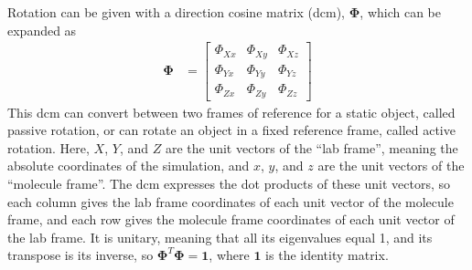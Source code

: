 \documentclass[11pt]{article}
\begin{document}
Rotation can be given with a direction cosine matrix (dcm), $\bm{\Phi}$, which can be expanded as
\begin{align}
\bm{\Phi} &= \left[ \begin{array}{ccc} \Phi_{Xx} & \Phi_{Xy} & \Phi_{Xz} \\ \Phi_{Yx} & \Phi_{Yy} & \Phi_{Yz} \\ \Phi_{Zx} & \Phi_{Zy} & \Phi_{Zz} \end{array} \right]
\label{eq:DirectionCosineMatrix}
\end{align}
This dcm can convert between two frames of reference for a static object, called passive rotation, or can rotate an object in a fixed reference frame, called active rotation. Here, $X$, $Y$, and $Z$ are the unit vectors of the ``lab frame'', meaning the absolute coordinates of the simulation, and $x$, $y$, and $z$ are the unit vectors of the ``molecule frame''. The dcm expresses the dot products of these unit vectors, so each column gives the lab frame coordinates of each unit vector of the molecule frame, and each row gives the molecule frame coordinates of each unit vector of the lab frame. It is unitary, meaning that all its eigenvalues equal 1, and its transpose is its inverse, so $\bm{\Phi}^T \bm{\Phi} = \bm{1}$, where $\bm{1}$ is the identity matrix.
\end{document}
